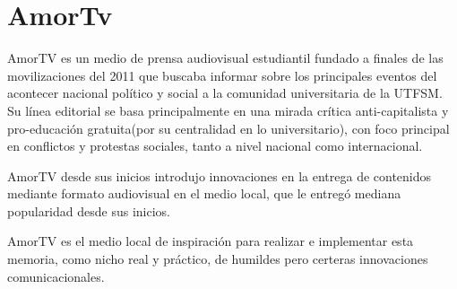 \section{AmorTv}

AmorTV \cite{amorTV} es un medio de prensa audiovisual estudiantil fundado a finales de las movilizaciones del 2011 que buscaba informar sobre los principales eventos del acontecer nacional político y social a la comunidad universitaria de la UTFSM. Su línea editorial se basa principalmente en una mirada crítica anti-capitalista y pro-educación gratuita(por su centralidad en lo universitario), con foco principal en conflictos y protestas sociales, tanto a nivel nacional como internacional.

AmorTV desde sus inicios introdujo innovaciones en la entrega de contenidos mediante formato audiovisual en el medio local, que le entregó mediana popularidad desde sus inicios. 

AmorTV es el medio local de inspiración para realizar e implementar esta memoria, como nicho real y práctico, de humildes pero certeras innovaciones comunicacionales.